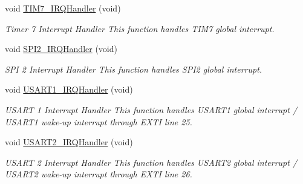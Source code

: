 \begin{DoxyCompactItemize}
\mbox{\label{group___s_d___interrupt___functions_ga98cff83252098363b2dbca9608df964e}} 
void \mbox{\hyperlink{group___s_d___interrupt___functions_ga98cff83252098363b2dbca9608df964e}{T\+I\+M7\+\_\+\+I\+R\+Q\+Handler}} (void)
\begin{DoxyCompactList}\small\item\em Timer 7 Interrupt Handler This function handles T\+I\+M7 global interrupt. \end{DoxyCompactList}\item 
\mbox{\label{group___s_d___interrupt___functions_ga68d8880cd80cb17a2501487c3d649ea1}} 
void \mbox{\hyperlink{group___s_d___interrupt___functions_ga68d8880cd80cb17a2501487c3d649ea1}{S\+P\+I2\+\_\+\+I\+R\+Q\+Handler}} (void)
\begin{DoxyCompactList}\small\item\em S\+PI 2 Interrupt Handler This function handles S\+P\+I2 global interrupt. \end{DoxyCompactList}\item 
\mbox{\label{group___s_d___interrupt___functions_ga7139cd4baabbbcbab0c1fe6d7d4ae1cc}} 
void \mbox{\hyperlink{group___s_d___interrupt___functions_ga7139cd4baabbbcbab0c1fe6d7d4ae1cc}{U\+S\+A\+R\+T1\+\_\+\+I\+R\+Q\+Handler}} (void)
\begin{DoxyCompactList}\small\item\em U\+S\+A\+RT 1 Interrupt Handler This function handles U\+S\+A\+R\+T1 global interrupt / U\+S\+A\+R\+T1 wake-\/up interrupt through E\+X\+TI line 25. \end{DoxyCompactList}\item 
\mbox{\label{group___s_d___interrupt___functions_ga0ca6fd0e6f77921dd1123539857ba0a8}} 
void \mbox{\hyperlink{group___s_d___interrupt___functions_ga0ca6fd0e6f77921dd1123539857ba0a8}{U\+S\+A\+R\+T2\+\_\+\+I\+R\+Q\+Handler}} (void)
\begin{DoxyCompactList}\small\item\em U\+S\+A\+RT 2 Interrupt Handler This function handles U\+S\+A\+R\+T2 global interrupt / U\+S\+A\+R\+T2 wake-\/up interrupt through E\+X\+TI line 26. \end{DoxyCompactList}\item 
\mbox{\label{group___s_d___interrupt___functions_ga1aabaf02d0eafd24b4634143c04af37d}} 

\end{DoxyCompactItemize}
